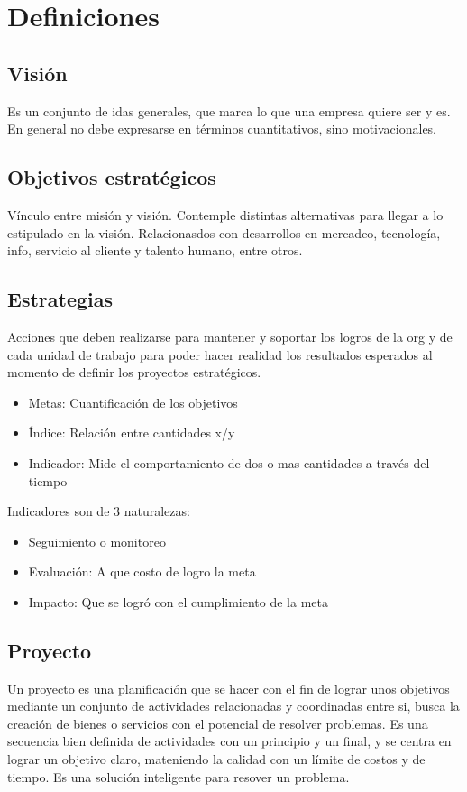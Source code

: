 \documentclass[a4paper, 11pt, oneside]{article}
\begin{document}
\section{Definiciones}

\subsection{Visión}
Es un conjunto de idas generales, que marca lo que una empresa quiere ser y es. En general 
no debe expresarse en términos cuantitativos, sino motivacionales.

\subsection{Objetivos estratégicos}
Vínculo entre misión y visión. Contemple distintas alternativas para llegar a lo estipulado
en la visión. Relacionasdos con desarrollos en mercadeo, tecnología, info, servicio al cliente 
y talento humano, entre otros.

\subsection{Estrategias}
Acciones que deben realizarse para mantener y soportar los logros de la org y de cada unidad de
trabajo para poder hacer realidad los resultados esperados al momento de definir los proyectos 
estratégicos.

\begin{itemize}
	\item Metas: Cuantificación de los objetivos
	\item Índice: Relación entre cantidades x/y
	\item Indicador: Mide el comportamiento de dos o mas cantidades a través del tiempo
\end{itemize}

Indicadores son de 3 naturalezas:

\begin{itemize}
	\item Seguimiento o monitoreo
	\item Evaluación: A que costo de logro la meta
	\item Impacto: Que se logró con el cumplimiento de la meta
\end{itemize}

\subsection{Proyecto}
Un proyecto es una planificación que se hacer con el fin de lograr unos objetivos mediante un
conjunto de actividades relacionadas y coordinadas entre si, busca la creación de bienes o 
servicios con el potencial de resolver problemas. Es una secuencia bien definida de actividades
con un principio y un final, y se centra en lograr un objetivo claro, mateniendo la calidad
con un límite de costos y de tiempo. Es una solución inteligente para resover un problema.
\end{document}
